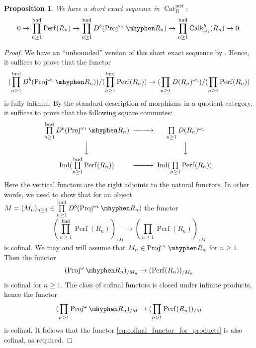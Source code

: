 \documentclass[11pt,leqno]{amsart}
\newtheorem{prop}[theo]{Proposition}
\numberwithin{equation}{section}
\newcommand{\hy}{\mhyphen}
\newcommand{\prodd}[1][]{\mathop{\prod}\limits_{#1}}
\newcommand{\bnd}{\operatorname{bnd}}
\newcommand{\Proj}{\operatorname{Proj}}
\newcommand{\Cat}{\operatorname{Cat}}
\newcommand{\Perf}{\operatorname{Perf}}
\newcommand{\perf}{\operatorname{perf}}
\newcommand{\Ind}{\operatorname{Ind}}
\newcommand{\Calk}{\operatorname{Calk}}
\begin{document}
\begin{prop}\label{prop:ses_of_bounded_products}
We have a short exact sequence in $\Cat_R^{\perf}:$
\begin{equation*}
0\to \prodd[n\geq 1]^{\bnd}\Perf(R_n)\to \prodd[n\geq 1]^{\bnd}D^b(\Proj^{\omega_1}\hy R_n)\to \prodd[n\geq 1]^{\bnd}\Calk_{\omega_1}^b(R_n)\to 0.
\end{equation*}
\end{prop}

\begin{proof}
We have an ``unbounded'' version of this short exact sequence by \cite[Lemma 5.2]{KW19}. Hence, it suffices to prove that the functor
\begin{equation*}
(\prodd[n\geq 1]^{\bnd}D^b(\Proj^{\omega_1}\hy R_n))/(\prodd[n\geq 1]^{\bnd}\Perf(R_n))\to (\prodd[n\geq 1]D(R_n)^{\omega_1})/(\prodd[n\geq 1]\Perf(R_n))
\end{equation*}
is fully faithful. By the standard description of morphisms in a quotient category, it suffices to prove that the following square commutes:
\begin{equation*}
\begin{CD}
\prodd[n\geq 1]^{\bnd}D^b(\Proj^{\omega_1}\hy R_n) @>>> \prodd[n\geq 1]D(R_n)^{\omega_1}\\
@VVV @VVV\\
\Ind(\prodd[n\geq 1]^{\bnd}\Perf(R_n)) @>>> \Ind(\prodd[n\geq 1]\Perf(R_n)). 
\end{CD}
\end{equation*}
Here the vertical functors are the right adjoints to the natural functors. In other words, we need to show that for an object $M=(M_n)_{n\geq 1}\in \prodd[n\geq 1]^{\bnd}D^b(\Proj^{\omega_1}\hy R_n)$ the functor
\begin{equation}\label{eq:cofinal_functor_for_products}
(\prodd[n\geq 1]^{\bnd}\Perf(R_n))_{/M}\to (\prodd[n\geq 1]\Perf(R_n))_{/M}
\end{equation}
is cofinal. We may and will assume that $M_n\in \Proj^{\omega_1}\hy R_n$ for $n\geq 1.$ Then the functor
\begin{equation*}
(\Proj^{\omega}\hy R_n)_{/M_n}\to (\Perf(R_n))_{/M_n} 
\end{equation*}
is cofinal for $n\geq 1.$ The class of cofinal functors is closed under infinite products, hence the functor
\begin{equation*}
(\prodd[n\geq 1]\Proj^{\omega}\hy R_n)_{/M}\to (\prodd[n\geq 1]\Perf(R_n))_{/M}
\end{equation*}
is cofinal. It follows that the functor \eqref{eq:cofinal_functor_for_products} is also cofinal, as required.
\end{proof}
\end{document}
